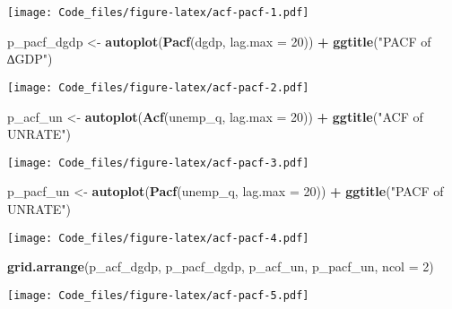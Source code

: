 \documentclass[
]{article}
\newenvironment{Shaded}{\begin{snugshade}}{\end{snugshade}}
\newcommand{\AttributeTok}[1]{\textcolor[rgb]{0.13,0.29,0.53}{#1}}
\newcommand{\DecValTok}[1]{\textcolor[rgb]{0.00,0.00,0.81}{#1}}
\newcommand{\FunctionTok}[1]{\textcolor[rgb]{0.13,0.29,0.53}{\textbf{#1}}}
\newcommand{\NormalTok}[1]{#1}
\newcommand{\OtherTok}[1]{\textcolor[rgb]{0.56,0.35,0.01}{#1}}
\newcommand{\SpecialCharTok}[1]{\textcolor[rgb]{0.81,0.36,0.00}{\textbf{#1}}}
\newcommand{\StringTok}[1]{\textcolor[rgb]{0.31,0.60,0.02}{#1}}
\begin{document}
\texttt{[image: Code\_files/figure-latex/acf-pacf-1.pdf]}

\begin{Shaded}
\begin{Highlighting}[]
\NormalTok{p\_pacf\_dgdp }\OtherTok{\textless{}{-}} \FunctionTok{autoplot}\NormalTok{(}\FunctionTok{Pacf}\NormalTok{(dgdp, }\AttributeTok{lag.max =} \DecValTok{20}\NormalTok{)) }\SpecialCharTok{+} \FunctionTok{ggtitle}\NormalTok{(}\StringTok{"PACF of ∆GDP"}\NormalTok{)}
\end{Highlighting}
\end{Shaded}

\texttt{[image: Code\_files/figure-latex/acf-pacf-2.pdf]}

\begin{Shaded}
\begin{Highlighting}[]
\NormalTok{p\_acf\_un   }\OtherTok{\textless{}{-}} \FunctionTok{autoplot}\NormalTok{(}\FunctionTok{Acf}\NormalTok{(unemp\_q, }\AttributeTok{lag.max =} \DecValTok{20}\NormalTok{)) }\SpecialCharTok{+} \FunctionTok{ggtitle}\NormalTok{(}\StringTok{"ACF of UNRATE"}\NormalTok{)}
\end{Highlighting}
\end{Shaded}

\texttt{[image: Code\_files/figure-latex/acf-pacf-3.pdf]}

\begin{Shaded}
\begin{Highlighting}[]
\NormalTok{p\_pacf\_un  }\OtherTok{\textless{}{-}} \FunctionTok{autoplot}\NormalTok{(}\FunctionTok{Pacf}\NormalTok{(unemp\_q, }\AttributeTok{lag.max =} \DecValTok{20}\NormalTok{)) }\SpecialCharTok{+} \FunctionTok{ggtitle}\NormalTok{(}\StringTok{"PACF of UNRATE"}\NormalTok{)}
\end{Highlighting}
\end{Shaded}

\texttt{[image: Code\_files/figure-latex/acf-pacf-4.pdf]}

\begin{Shaded}
\begin{Highlighting}[]
\FunctionTok{grid.arrange}\NormalTok{(p\_acf\_dgdp, p\_pacf\_dgdp, p\_acf\_un, p\_pacf\_un, }\AttributeTok{ncol =} \DecValTok{2}\NormalTok{)}
\end{Highlighting}
\end{Shaded}

\texttt{[image: Code\_files/figure-latex/acf-pacf-5.pdf]}
\end{document}
